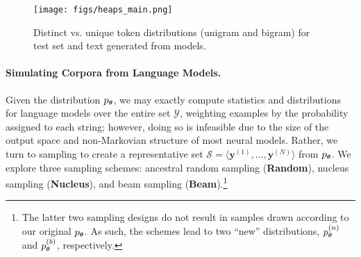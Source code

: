 \documentclass[11pt,a4paper]{article}
\newcommand{\yy}{\mathbf{y}}
\newcommand{\calY}{\mathcal{Y}}
\newcommand{\calS}{\mathcal{S}}
\newcommand{\vtheta}{{\boldsymbol \theta}}
\newcommand{\ptheta}{p_{\scaleto{\vtheta}{4pt}}}
\begin{document}
\begin{figure*}[!htpb]
\centering
    \texttt{[image: figs/heaps\_main.png]}
  \caption{Distinct vs. unique token distributions (unigram and bigram) for test set and text generated from models. }
    \label{fig:heapsmain}
    \vspace{-1em}
\end{figure*}


\paragraph{Simulating Corpora from Language Models.} 
Given the distribution $\ptheta$, we may exactly compute statistics and distributions for language models over the entire set $\calY$, weighting examples by the probability assigned to each string; however, doing so is infeasible due to the size of the output space and non-Markovian structure of most neural models.
Rather, we turn to sampling to create a representative set $\calS = \langle\yy^{(1)}, \dots, \yy^{(N)} \rangle$ from $\ptheta$.
We explore three sampling schemes: ancestral random sampling (\textbf{Random}), nucleus sampling (\textbf{Nucleus}), and beam sampling (\textbf{Beam}).\footnote{The latter two sampling designs do not result in samples drawn according to our original $ \ptheta$. As such, the schemes lead to two ``new'' distributions, $\ptheta^{(n)}$ and $\ptheta^{(b)}$, respectively.} 
\end{document}
